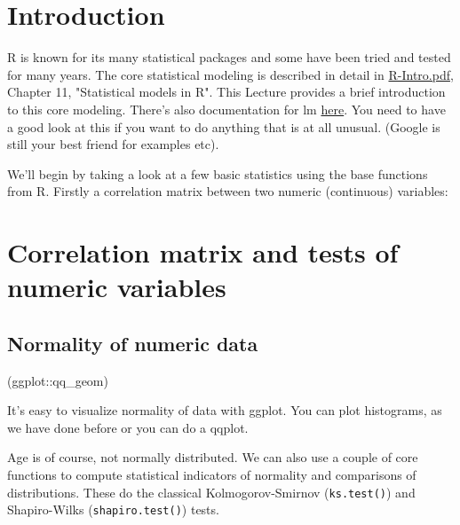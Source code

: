 \documentclass[titlepage]{book}\usepackage{knitr}
\begin{document}
\section{Introduction}

R is known for its many statistical packages and some have been tried and tested for many years.  The core statistical modeling is described in detail in \href{https://cran.r-project.org/doc/manuals/r-release/R-intro.pdf}{R-Intro.pdf}, Chapter 11, "Statistical models in R".  This Lecture provides a brief introduction to this core modeling.
There's also documentation for lm \href{http://stat.ethz.ch/R-manual/R-devel/library/stats/html/lm.html}{here}. You need to have a good look at this if you want to do anything that is at all unusual. (Google is still your best friend for examples etc).

We'll begin by taking a look at a few basic statistics using the base functions from R. Firstly a correlation matrix between two numeric (continuous) variables:

\section{Correlation matrix and tests of numeric variables}

\subsection{Normality of numeric data}\index(ggplot::qq\_geom)

It's easy to visualize normality of data with ggplot.  You can plot histograms, as we have done before or you can do a qqplot.

\begin{knitrout}
\color{fgcolor}\begin{kframe}
\begin{alltt}
 \hlkwb{<-}  \hlstd{(} \hlopt{+}
 \hlstd{()} \hlopt{+} \hlstd{()}
\end{alltt}
\end{kframe}
\end{knitrout}

Age is of course, not normally distributed.  We can also use a couple of core functions to compute statistical indicators of normality and comparisons of distributions. These do the classical Kolmogorov-Smirnov (\texttt{ks.test()}) and Shapiro-Wilks (\texttt{shapiro.test()}) tests.
\end{document}
